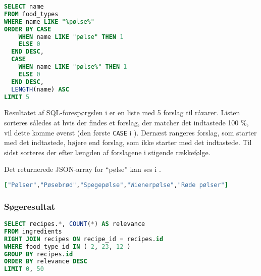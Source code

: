 \begin{lstlisting}[caption={Hvis en bruger indtaster ``pølse'' udføres denne SQL-forespørgsel.},label=lst:soegeforslag-sql,language=SQL]
SELECT name
FROM food_types
WHERE name LIKE "%pølse%"
ORDER BY CASE
    WHEN name LIKE "pølse" THEN 1
    ELSE 0
  END DESC,
  CASE
    WHEN name LIKE "pølse%" THEN 1
    ELSE 0
  END DESC,
  LENGTH(name) ASC
LIMIT 5
\end{lstlisting}

Resultatet af SQL-forespørgslen i  er en liste med 5 forslag til råvarer. Listen sorteres således at hvis der findes et forslag, der matcher det indtastede 100 \%, vil dette komme øverst (den første \texttt{CASE} i ). Dernæst rangeres forslag, som starter med det indtastede, højere end forslag, som ikke starter med det indtastede. Til sidst sorteres der efter længden af forslagene i stigende rækkefølge.

Det returnerede JSON-array for ``pølse'' kan ses i .

\begin{lstlisting}[caption={Et returneret JSON-array for ``pølse''.},label=lst:poelse-json,language=Ruby]
["Pølser","Pøsebrød","Spegepølse","Wienerpølse","Røde pølser"]
\end{lstlisting}

\subsubsection{Søgeresultat}
\begin{lstlisting}[caption={SQL query.},label=lst:soegeresultat-sql,language=SQL]
SELECT recipes.*, COUNT(*) AS relevance
FROM ingredients
RIGHT JOIN recipes ON recipe_id = recipes.id
WHERE food_type_id IN ( 2, 23, 12 )
GROUP BY recipes.id
ORDER BY relevance DESC
LIMIT 0, 50
\end{lstlisting}

